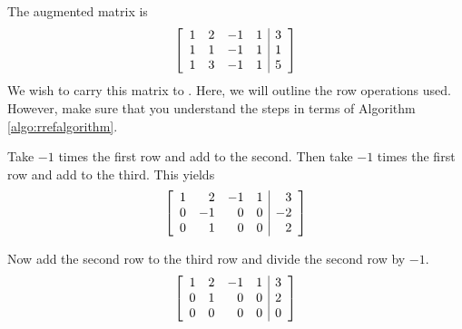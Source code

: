 \begin{solution} The augmented matrix is
\begin{equation*}
\left[
\begin{array}{rrrr|r}
1 & 2 & -1 & 1 & 3 \\
1 & 1 & -1 & 1 & 1 \\
1 & 3 & -1 & 1 & 5
\end{array}
\right] 
\end{equation*}
We wish to carry this matrix to \ef. Here, we will outline the row operations used. However, make sure that you 
understand the steps in terms of Algorithm \ref{algo:rrefalgorithm}.

Take $-1$ times the first row and add to the second. Then take $-1$ times
the first row and add to the third. This yields
\begin{equation*}
\left[
\begin{array}{rrrr|r}
1 & 2 & -1 & 1 & 3 \\
0 & -1 & 0 & 0 & -2 \\
0 & 1 & 0 & 0 & 2
\end{array}
\right]
\end{equation*}

Now add the second row to the third row and divide the second row by $-1$.
\begin{equation}
\left[
\begin{array}{rrrr|r}
1 & 2 & -1 & 1 & 3 \\
0 & 1 & 0 & 0 & 2 \\
0 & 0 & 0 & 0 & 0
\end{array}
\right]  \label{twoparameters1}
\end{equation}




\end{solution}
